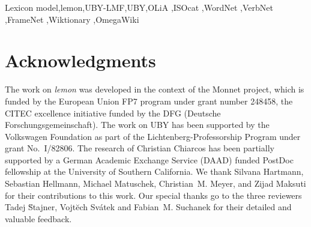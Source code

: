 \documentclass[sw]{iosart2c}
\newcommand{\lemon}{\emph{lemon}}
\begin{document}
\begin{frontmatter}
\begin{abstract}
\end{abstract}

\begin{keyword}
Lexicon model\sep lemon\sep UBY-LMF\sep UBY\sep OLiA \sep ISOcat \sep  WordNet \sep VerbNet \sep FrameNet  \sep Wiktionary \sep Ome\-ga\-Wi\-ki
\end{keyword}

\end{frontmatter}


%


 
 
 
 

\section*{Acknowledgments}
The work on \emph{lemon} was developed in the context of the Monnet project, which is funded by the European Union FP7 program under
grant number 248458, the CITEC excellence initiative funded by the DFG (Deutsche Forschungsgemeinschaft).
The work on UBY has been supported by the Volks\-wagen Foundation as part of the Lichtenberg-Professorship Program under grant No.\ I/82806.
The research of Christian Chiarcos has been partially supported by a German Academic Exchange Service (DAAD) funded PostDoc fellowship at the University of Southern California.
We thank Silvana Hartmann, Sebastian Hellmann, Michael Matuschek, Christian~M. Meyer, and Zijad Maksuti for their contributions to this work.
Our special thanks go to the three reviewers Tadej \u{S}tajner, Vojt\u{e}ch Sv\'{a}tek and Fabian~M. Suchanek for their
detailed and valuable feedback.

%
 
 
\end{document}

